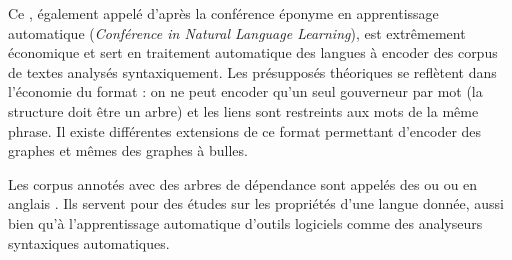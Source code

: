 {    Ce , également appelé  d’après la conférence éponyme en apprentissage automatique (\textit{Conférence in Natural Language Learning}), est extrêmement économique et sert en traitement automatique des langues à encoder des corpus de textes analysés syntaxiquement. Les présupposés théoriques se reflètent dans l’économie du format : on ne peut encoder qu’un seul gouverneur par mot (la structure doit être un arbre) et les liens sont restreints aux mots de la même phrase. Il existe différentes extensions de ce format permettant d’encoder des graphes et mêmes des graphes à bulles.

    Les corpus annotés avec des arbres de dépendance sont appelés des  ou  ou en anglais . Ils servent pour des études sur les propriétés d’une langue donnée, aussi bien qu’à l’apprentissage automatique d’outils logiciels comme des analyseurs syntaxiques automatiques.
}

